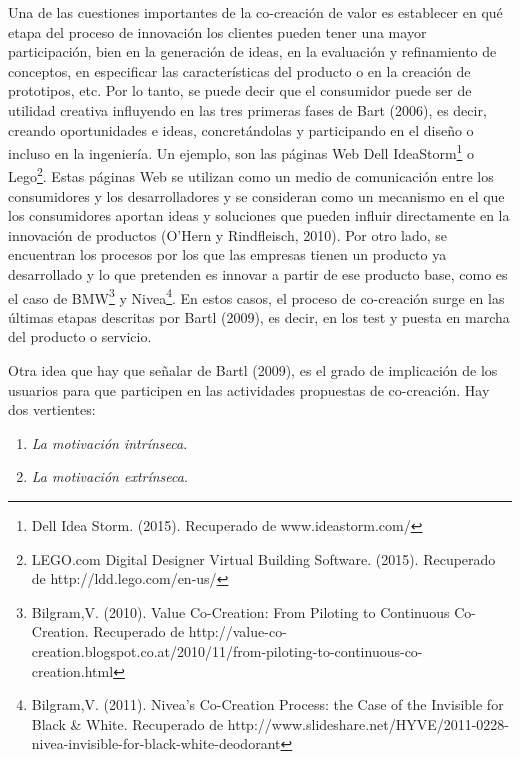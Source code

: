 Una de las cuestiones importantes de la co-creación de valor es establecer en qué etapa del proceso de innovación los clientes pueden tener una mayor participación, bien en la generación de ideas, en la evaluación y refinamiento de conceptos, en especificar las características del producto o en la creación de prototipos, etc. Por lo tanto, se puede decir que el consumidor puede ser de utilidad creativa influyendo en las tres primeras fases de Bart (2006), es decir, creando oportunidades e ideas, concretándolas y participando en el diseño o incluso en la ingeniería. Un ejemplo, son las páginas Web Dell IdeaStorm\footnote{Dell Idea Storm. (2015). Recuperado de www.ideastorm.com/} o Lego\footnote{LEGO.com Digital Designer Virtual Building Software. (2015). Recuperado de http://ldd.lego.com/en-us/}. Estas páginas Web se utilizan como un medio de comunicación entre los consumidores y los desarrolladores y se consideran como un mecanismo en el que los consumidores aportan ideas y soluciones que pueden influir directamente en la innovación de productos (O'Hern y Rindfleisch, 2010). Por otro lado, se encuentran los procesos por los que las empresas tienen un producto ya desarrollado y lo que pretenden es innovar a partir de ese producto base, como es el caso de BMW\footnote{Bilgram,V. (2010). Value Co-Creation: From Piloting to Continuous Co-Creation. Recuperado de http://value-co-creation.blogspot.co.at/2010/11/from-piloting-to-continuous-co-creation.html} y Nivea\footnote{Bilgram,V. (2011). Nivea's Co-Creation Process: the Case of the Invisible for Black \& White. Recuperado de http://www.slideshare.net/HYVE/2011-0228-nivea-invisible-for-black-white-deodorant}. En estos casos, el proceso de co-creación surge en las últimas etapas descritas por Bartl (2009), es decir, en los test y puesta en marcha del producto o servicio.

Otra idea que hay que señalar de Bartl (2009), es el grado de implicación de los usuarios para que participen en las actividades propuestas de co-creación. Hay dos vertientes:

\begin{enumerate}
	\item \emph{La motivación intrínseca}.
	\item \emph{La motivación extrínseca}.
\end{enumerate}

